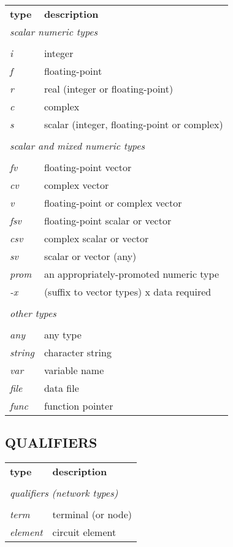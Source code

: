\begin{tabular}{ll}
{\bf type} & {\bf description} \\
\multicolumn{2}{l}{\sl scalar numeric types} \\
\\
{\it i} & integer \\
{\it f} & floating-point \\
{\it r} & real (integer or floating-point) \\
{\it c} & complex \\
{\it s} & scalar (integer, floating-point or complex) \\
\\
\multicolumn{2}{l}{\sl scalar and mixed numeric types} \\
\\
{\it fv} & floating-point vector \\
{\it cv} & complex vector \\
{\it v} & floating-point or complex vector \\
{\it fsv} & floating-point scalar or vector \\
{\it csv} & complex scalar or vector \\
{\it sv} & scalar or vector (any) \\
{\it prom} & an appropriately-promoted numeric type \\
{\it -x} & (suffix to vector types) x data required \\
\\
\multicolumn{2}{l}{\sl other types} \\
\\
{\it any} & any type \\
{\it string} & character string \\
{\it var} & variable name \\ 
{\it file} & data file \\
{\it func} & function pointer
\end{tabular}

\subsection[Qualifiers]{QUALIFIERS}

\begin{tabular}{ll}
{\bf type} & {\bf description} \\
\\
\multicolumn{2}{l}{\sl qualifiers  (network types)} \\
\\
{\it term} & terminal (or node)\\
{\it element} & circuit element
\end{tabular}


